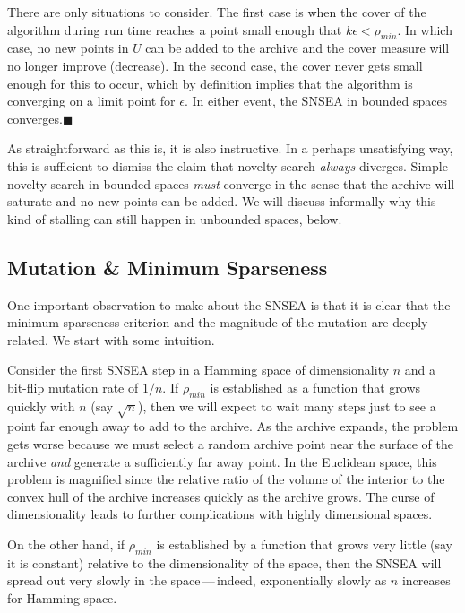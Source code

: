 \documentclass[twoside]{article}
\begin{document}
There are only situations to consider.  The first case is when the cover of the algorithm during run time reaches a point small enough that $k\epsilon < \rho_{min}$.  In which case, no new points in $U$ can be added to the archive and the cover measure will no longer improve (decrease).  In the second case, the cover never gets small enough for this to occur, which by definition implies that the algorithm is converging on a limit point for $\epsilon$.  In either event, the SNSEA in bounded spaces converges.$\blacksquare$

\vspace*{1ex}

As straightforward as this is, it is also instructive.  In a perhaps unsatisfying way, this is sufficient to dismiss the claim that novelty search \emph{always} diverges.  Simple novelty search in bounded spaces \emph{must} converge in the sense that the archive will saturate and no new points can be added.  We will discuss informally why this kind of stalling can still happen in unbounded spaces, below.


\subsection{Mutation \& Minimum Sparseness}
\label{subsec:mutation}
One important observation to make about the SNSEA is that it is clear that the minimum sparseness criterion and the magnitude of the mutation are deeply related.  We start with some intuition.

Consider the first SNSEA step in a Hamming space of dimensionality $n$ and a bit-flip mutation rate of $1/n$.  If $\rho_{min}$ is established as a function that grows quickly with $n$ (say $\sqrt{n}$), then we will expect to wait many steps just to see a point far enough away to add to the archive.  As the archive expands, the problem gets worse because we must select a random archive point near the surface of the archive \emph{and} generate a sufficiently far away point.  In the Euclidean space, this problem is magnified since the relative ratio of the volume of the interior to the convex hull of the archive increases quickly as the archive grows.  The curse of dimensionality leads to further complications with highly dimensional spaces.

On the other hand, if $\rho_{min}$ is established by a function that grows very little (say it is constant) relative to the dimensionality of the space, then the SNSEA will spread out very slowly in the space\,---\,indeed, exponentially slowly as $n$ increases for Hamming space.  
\end{document}
